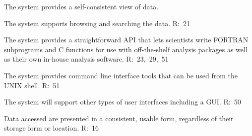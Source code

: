 \begin{list}{.}{}

\item The system provides a self-consistent view of data.  

\item The system supports browsing and searching the data. R:~21

\item The system provides a straightforward API that lets scientists write
FORTRAN subprograms and C functions for use with off-the-shelf analysis
packages as well as their own in-house analysis software. R:~23,~29,~51

\item The system provides command line interface tools that can be used
from the UNIX shell. R:~51

\item The system will support other types of user interfaces including a
GUI. R:~50

\item Data accessed are presented in a consistent, usable form,
regardless of their storage form or location. R:~16

\end{list}

